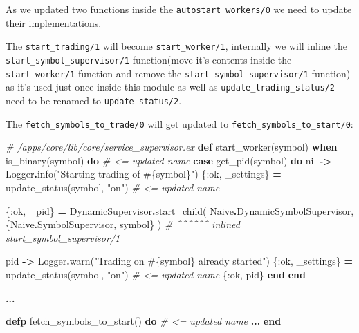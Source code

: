 \documentclass[
  oneside]{book}
\newenvironment{Shaded}{\begin{snugshade}}{\end{snugshade}}
\newcommand{\CommentTok}[1]{\textcolor[rgb]{0.56,0.35,0.01}{\textit{#1}}}
\newcommand{\ConstantTok}[1]{\textcolor[rgb]{0.00,0.00,0.00}{#1}}
\newcommand{\KeywordTok}[1]{\textcolor[rgb]{0.13,0.29,0.53}{\textbf{#1}}}
\newcommand{\NormalTok}[1]{#1}
\newcommand{\OperatorTok}[1]{\textcolor[rgb]{0.81,0.36,0.00}{\textbf{#1}}}
\newcommand{\OtherTok}[1]{\textcolor[rgb]{0.56,0.35,0.01}{#1}}
\newcommand{\StringTok}[1]{\textcolor[rgb]{0.31,0.60,0.02}{#1}}
\newcommand{\VariableTok}[1]{\textcolor[rgb]{0.00,0.00,0.00}{#1}}
\begin{document}
As we updated two functions inside the \texttt{autostart\_workers/0} we need to update their implementations.

The \texttt{start\_trading/1} will become \texttt{start\_worker/1}, internally we will inline the \texttt{start\_symbol\_supervisor/1} function(move it's contents inside the \texttt{start\_worker/1} function and remove the \texttt{start\_symbol\_supervisor/1} function) as it's used just once inside this module as well as \texttt{update\_trading\_status/2} need to be renamed to \texttt{update\_status/2}.

The \texttt{fetch\_symbols\_to\_trade/0} will get updated to \texttt{fetch\_symbols\_to\_start/0}:

\begin{Shaded}
\begin{Highlighting}[]
  \CommentTok{\# /apps/core/lib/core/service\_supervisor.ex}
  \KeywordTok{def}\NormalTok{ start\_worker(symbol) }\KeywordTok{when}\NormalTok{ is\_binary(symbol) }\KeywordTok{do} \CommentTok{\# \textless{}= updated name}
    \KeywordTok{case}\NormalTok{ get\_pid(symbol) }\KeywordTok{do}
      \ConstantTok{nil} \OperatorTok{{-}\textgreater{}}
        \ConstantTok{Logger}\OperatorTok{.}\NormalTok{info(}\StringTok{"Starting trading of }\OtherTok{\#\{}\NormalTok{symbol}\OtherTok{\}}\StringTok{"}\NormalTok{)}
\NormalTok{        \{}\VariableTok{:ok}\NormalTok{, \_settings\} }\OperatorTok{=}\NormalTok{ update\_status(symbol, }\StringTok{"on"}\NormalTok{) }\CommentTok{\# \textless{}= updated name}

\NormalTok{        \{}\VariableTok{:ok}\NormalTok{, \_pid\} }\OperatorTok{=}
          \ConstantTok{DynamicSupervisor}\OperatorTok{.}\NormalTok{start\_child(}
            \ConstantTok{Naive}\OperatorTok{.}\ConstantTok{DynamicSymbolSupervisor}\NormalTok{,}
\NormalTok{            \{}\ConstantTok{Naive}\OperatorTok{.}\ConstantTok{SymbolSupervisor}\NormalTok{, symbol\}}
\NormalTok{          )  }\CommentTok{\# \^{}\^{}\^{}\^{}\^{}\^{} inlined \textasciigrave{}start\_symbol\_supervisor/1\textasciigrave{}}

\NormalTok{      pid }\OperatorTok{{-}\textgreater{}}
        \ConstantTok{Logger}\OperatorTok{.}\NormalTok{warn(}\StringTok{"Trading on }\OtherTok{\#\{}\NormalTok{symbol}\OtherTok{\}}\StringTok{ already started"}\NormalTok{)}
\NormalTok{        \{}\VariableTok{:ok}\NormalTok{, \_settings\} }\OperatorTok{=}\NormalTok{ update\_status(symbol, }\StringTok{"on"}\NormalTok{) }\CommentTok{\# \textless{}= updated name}
\NormalTok{        \{}\VariableTok{:ok}\NormalTok{, pid\}}
    \KeywordTok{end}
  \KeywordTok{end}

  \OperatorTok{...}

  \KeywordTok{defp}\NormalTok{ fetch\_symbols\_to\_start() }\KeywordTok{do} \CommentTok{\# \textless{}= updated name}
    \OperatorTok{...}
  \KeywordTok{end}  
\end{Highlighting}
\end{Shaded}
\end{document}
